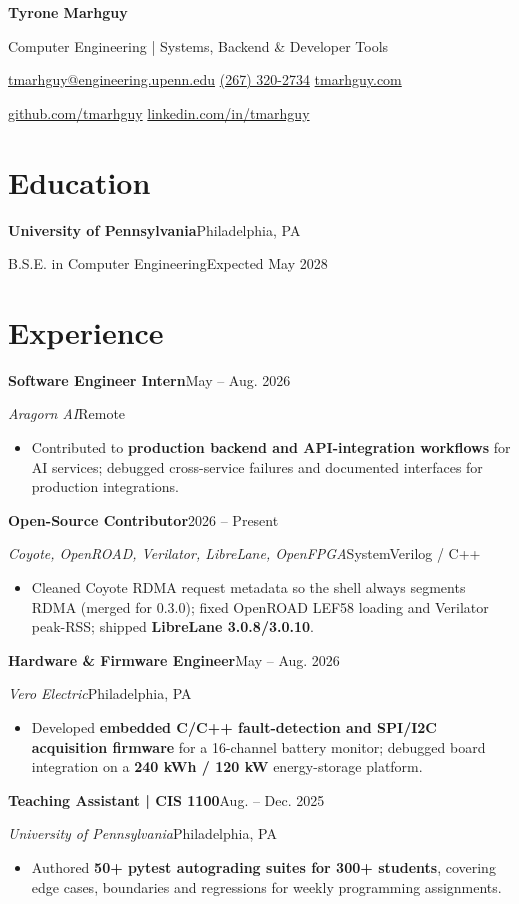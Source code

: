 \documentclass[10pt,letterpaper]{article}
\newcommand{\role}[4]{\par\addvspace{4pt}%
  \textbf{#1}\hfill {\small #2}\par
  \textit{#3}\hfill {\small #4}\par}
\begin{document}
\fontsize{10.7}{12.6}\selectfont
\begin{center}
{\fontsize{23}{25}\selectfont\bfseries Tyrone Marhguy}\par
\vspace{3pt}
Computer Engineering | Systems, Backend \& Developer Tools\par
\vspace{3pt}
{\small \href{mailto:tmarhguy@engineering.upenn.edu}{tmarhguy@engineering.upenn.edu}
\enspace\textbar\enspace \href{tel:+12673202734}{(267) 320-2734}
\enspace\textbar\enspace \href{https://tmarhguy.com}{tmarhguy.com}\par
\href{https://github.com/tmarhguy}{github.com/tmarhguy}
\enspace\textbar\enspace \href{https://linkedin.com/in/tmarhguy}{linkedin.com/in/tmarhguy}}
\end{center}
\section{Education}
\textbf{University of Pennsylvania}\hfill Philadelphia, PA\par
B.S.E. in Computer Engineering\hfill Expected May 2028\par

\section{Experience}
\role{Software Engineer Intern}{May -- Aug. 2026}{Aragorn AI}{Remote}
\begin{itemize}
\item Contributed to \textbf{production backend and API-integration workflows} for AI services; debugged cross-service failures and documented interfaces for production integrations.
\end{itemize}
\role{Open-Source Contributor}{2026 -- Present}{Coyote, OpenROAD, Verilator, LibreLane, OpenFPGA}{SystemVerilog / C++}
\begin{itemize}
\item Cleaned Coyote RDMA request metadata so the shell always segments RDMA (merged for 0.3.0); fixed OpenROAD LEF58 loading and Verilator peak-RSS; shipped \textbf{LibreLane 3.0.8/3.0.10}.
\end{itemize}
\role{Hardware \& Firmware Engineer}{May -- Aug. 2026}{Vero Electric}{Philadelphia, PA}
\begin{itemize}
\item Developed \textbf{embedded C/C++ fault-detection and SPI/I2C acquisition firmware} for a 16-channel battery monitor; debugged board integration on a \textbf{240 kWh / 120 kW} energy-storage platform.
\end{itemize}
\role{Teaching Assistant | CIS 1100}{Aug. -- Dec. 2025}{University of Pennsylvania}{Philadelphia, PA}
\begin{itemize}
\item Authored \textbf{50+ pytest autograding suites for 300+ students}, covering edge cases, boundaries and regressions for weekly programming assignments.
\end{itemize}
\end{document}
